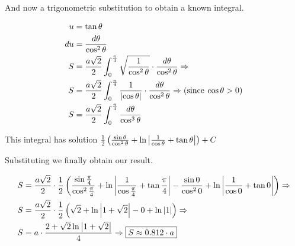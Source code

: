 \documentclass{article}
\begin{document}
And now a trigonometric substitution to obtain a known integral.

\begin{align*}
u &= \tan\theta \\
du &= \frac{d\theta}{\cos^2\theta} \\
S &= \frac{a\sqrt{2}}{2}\int_0^{\frac{\pi}{4}}\sqrt{\frac{1}{\cos^2\theta}}\cdot \frac{d\theta}{\cos^2\theta} \Rightarrow \\
S &= \frac{a\sqrt{2}}{2}\int_0^{\frac{\pi}{4}}\frac{1}{\abs{\cos\theta}}\cdot \frac{d\theta}{\cos^2\theta} \Rightarrow (\text{since} \: \cos\theta > 0) \\
S &= \frac{a\sqrt{2}}{2}\int_0^{\frac{\pi}{4}} \frac{d\theta}{\cos^3\theta}
\end{align*}

This integral has solution $\frac{1}{2}\left(\frac{\sin\theta}{\cos^2\theta} + \ln\abs{\frac{1}{\cos\theta} + \tan\theta}\right) + C$

Substituting we finally obtain our result.

\begin{align*}
S &= \frac{a\sqrt{2}}{2} \cdot \frac{1}{2}\left( \frac{\sin\frac{\pi}{4}}{\cos^2\frac{\pi}{4}} + \ln\abs{\frac{1}{\cos\frac{\pi}{4}} + \tan\frac{\pi}{4}} - \frac{\sin0}{\cos^20} + \ln\abs{\frac{1}{\cos0} + \tan0} \right) \Rightarrow \\
S &= \frac{a\sqrt{2}}{2} \cdot \frac{1}{2}\left( \sqrt{2} + \ln\abs{1 + \sqrt{2}} - 0 + \ln\abs{1} \right) \Rightarrow \\
S &= a \cdot \frac{2 + \sqrt{2}\ln\abs{1 + \sqrt{2}}}{4} \Rightarrow \boxed{S \approx 0.812 \cdot a}
\end{align*}
\end{document}
